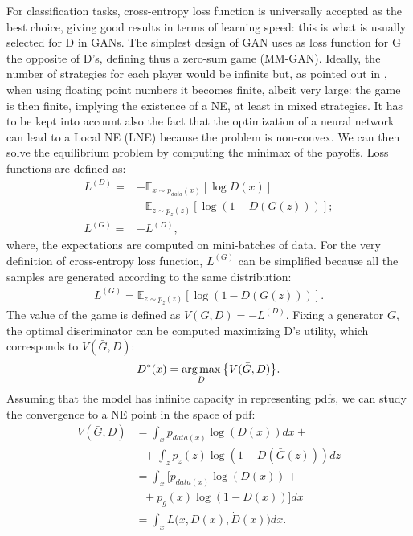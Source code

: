 For classification tasks, cross-entropy loss function is universally accepted as the best choice, giving good results in terms of learning speed: this is what is usually selected for D in GANs.
The simplest design of GAN uses as loss function for G the opposite of D's, defining thus a zero-sum game (MM-GAN).
Ideally, the number of strategies for each player would be infinite but, as pointed out in  \cite{2017arXiv171200679O}, when using floating point numbers it becomes finite, albeit very large: the game is then finite, implying the existence of a NE, at least in mixed strategies.
It has to be kept into account also the fact that the optimization of a neural network can lead to a Local NE (LNE) because the problem is non-convex.
We can then solve the equilibrium problem by computing the minimax of the payoffs.
Loss functions are defined as:
\begin{equation*}
	\begin{split}
		L^{(D)} = &-\mathbb{E}_{x \sim p_{data}(x)}[\log D(x)]\\
		          &- \mathbb{E}_{z \sim p_{z}(z)}[\log (1-D(G(z)))];\\
		L^{(G)} = &- L^{(D)},
	\end{split}
\end{equation*}
where, the expectations are computed on mini-batches of data.
For the very definition of cross-entropy loss function, $L^{(G)}$ can be simplified because all the samples are generated according to the same distribution: 
\begin{align*}
L^{(G)} = \mathbb{E}_{z \sim p_{z}(z)}[\log (1-D(G(z)))].
\end{align*}
The value of the game is defined as $V(G,D)=-L^{(D)}$.
Fixing a generator $\bar{G}$, the optimal discriminator can be computed maximizing D's utility, which corresponds to $V(\bar{G},D)$:
\begin{align*}
D^*(x) = \operatorname*{arg\,max}\limits_{D} \big\{V(\bar{G},D) \big\}.
\end{align*}
Assuming that the model has infinite capacity in representing pdfs, we can study the convergence to a NE point in the space of pdf:
\begin{equation*}
\begin{split}
V(\bar{G},D) & = \int_x p_{data(x)} \log(D(x)) dx +\\
             & \ \ \ + \int_z p_{z}(z) \log(1-D(\bar{G}(z))) dz\\
             & = \int_x\Big[p_{data(x)} \log(D(x)) +\\
             & \ \ \ + p_{g}(x) \log(1-D(x)) \Big]dx\\
             & = \int_x L\big(x,D(x),\dot{D}(x)\big)dx.
\end{split}
\end{equation*}
